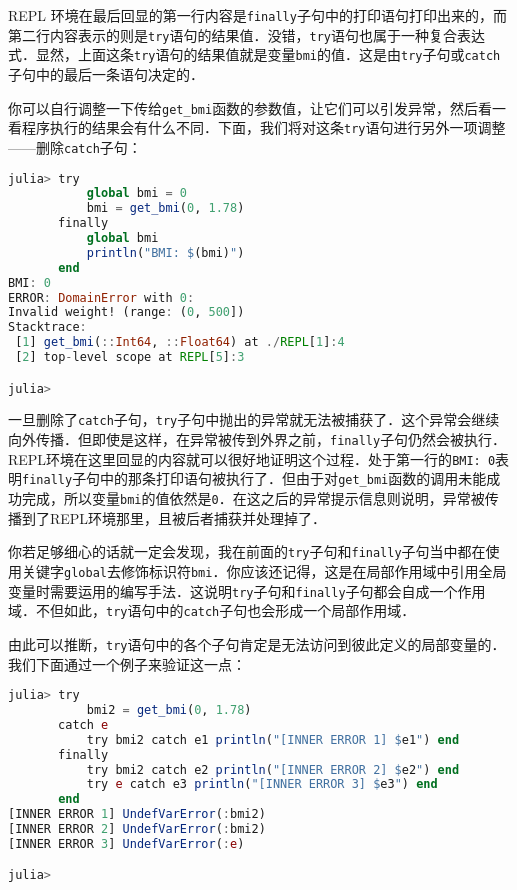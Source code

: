 REPL 环境在最后回显的第一行内容是\verb|finally|子句中的打印语句打印出来的，而第二行内容表示的则是\verb|try|语句的结果值．没错，\verb|try|语句也属于一种复合表达式．显然，上面这条\verb|try|语句的结果值就是变量\verb|bmi|的值．这是由\verb|try|子句或\verb|catch|子句中的最后一条语句决定的．

你可以自行调整一下传给\verb|get_bmi|函数的参数值，让它们可以引发异常，然后看一看程序执行的结果会有什么不同．下面，我们将对这条\verb|try|语句进行另外一项调整——删除\verb|catch|子句：

\begin{lstlisting}[language=julia]
julia> try 
           global bmi = 0
           bmi = get_bmi(0, 1.78)
       finally
           global bmi
           println("BMI: $(bmi)")
       end
BMI: 0
ERROR: DomainError with 0:
Invalid weight! (range: (0, 500])
Stacktrace:
 [1] get_bmi(::Int64, ::Float64) at ./REPL[1]:4
 [2] top-level scope at REPL[5]:3

julia> 
\end{lstlisting}

一旦删除了\verb|catch|子句，\verb|try|子句中抛出的异常就无法被捕获了．这个异常会继续向外传播．但即使是这样，在异常被传到外界之前，\verb|finally|子句仍然会被执行．REPL环境在这里回显的内容就可以很好地证明这个过程．处于第一行的\verb|BMI: 0|表明\verb|finally|子句中的那条打印语句被执行了．但由于对\verb|get_bmi|函数的调用未能成功完成，所以变量\verb|bmi|的值依然是\verb|0|．在这之后的异常提示信息则说明，异常被传播到了REPL环境那里，且被后者捕获并处理掉了．

你若足够细心的话就一定会发现，我在前面的\verb|try|子句和\verb|finally|子句当中都在使用关键字\verb|global|去修饰标识符\verb|bmi|．你应该还记得，这是在局部作用域中引用全局变量时需要运用的编写手法．这说明\verb|try|子句和\verb|finally|子句都会自成一个作用域．不但如此，\verb|try|语句中的\verb|catch|子句也会形成一个局部作用域．

由此可以推断，\verb|try|语句中的各个子句肯定是无法访问到彼此定义的局部变量的．我们下面通过一个例子来验证这一点：

\begin{lstlisting}[language=julia]
julia> try 
           bmi2 = get_bmi(0, 1.78)
       catch e
           try bmi2 catch e1 println("[INNER ERROR 1] $e1") end
       finally
           try bmi2 catch e2 println("[INNER ERROR 2] $e2") end
           try e catch e3 println("[INNER ERROR 3] $e3") end
       end
[INNER ERROR 1] UndefVarError(:bmi2)
[INNER ERROR 2] UndefVarError(:bmi2)
[INNER ERROR 3] UndefVarError(:e)

julia> 
\end{lstlisting}

